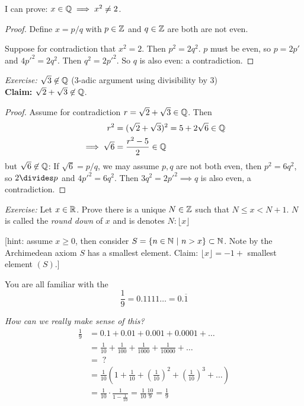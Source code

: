 \documentclass[10pt]{scrartcl}
\begin{document}
I can prove: $x \in \mathbb{Q} \implies x^2 \neq 2$. 
\begin{proof}
Define $x = p/q$ with $p \in \mathbb{Z}$ and $q\in \mathbb{Z}$ are both are not even. 

Suppose for contradiction that $x^2 = 2$. Then $p^2 = 2q^2$. $p$ must be even, so $p = 2p'$ and $4p'^2 = 2q^2$. Then $q^2 = 2p'^2$. So $q$ is also even: a contradiction. 
\end{proof}

\emph{Exercise:} $\sqrt{3} \not \in \mathbb{Q}$ ($3$-adic argument using divisibility by $3$)\\

\textbf{Claim:} $\sqrt{2} + \sqrt{3} \not \in \mathbb{Q}$. 
\begin{proof}
	Assume for contradiction $r = \sqrt{2} + \sqrt{3} \in \mathbb{Q}$. Then 
	\[
\begin{aligned}
  r^2 &= (\sqrt{2} + \sqrt{3})^2 = 5 + 2\sqrt{6} \in \mathbb{Q}\\
  \implies \sqrt{6} &= \frac{r^2-5}{2} \in \mathbb{Q} 
\end{aligned}
\]
but $\sqrt{6} \not \in \mathbb{Q}$: If $\sqrt{6} = p/q$, we may assume $p,q$ are not both even, then $p^2 = 6q^2$, so $2 \divides p$ and $4p'^2 = 6q^2$. Then $3q^2 = 2p'^2 \implies q$ is also even, a contradiction. 
\end{proof}

\emph{Exercise:} Let $x \in\mathbb{R}$. Prove there is a unique $N \in \mathbb{Z}$ such that $N \leq x < N+1$. $N$ is called the \emph{round down} of $x$ and is denotes $N: \lfloor x \rfloor$

[hint: assume $x \geq 0$, then  consider $S = \{n \in\mathbb{N} ~|~ n > x\} \subset \mathbb{N}$. Note by the Archimedean axiom $S$ has a smallest element. Claim: $\lfloor x \rfloor = -1 + $ smallest element $(S)$.]


You are all familiar with the
\[\frac{1}{9} = 0.1111\dots = 0.\overline{1}\]\vspace*{5pt}

\emph{How can we really make sense of this?}
\[
\begin{aligned}
  \frac{1}{9} &= 0.1 + 0.01 + 0.001 + 0.0001 + \dots\\
  &= \frac{1}{10} + \frac{1}{100} + \frac{1}{1000} + \frac{1}{10000} + \dots\\
  &= \; ? \\
  &= \frac{1}{10}\left(1 + \frac{1}{10} + \left(\frac{1}{10}\right)^2 + \left(\frac{1}{10}\right)^3 + \dots \right)\\ 
  &= \frac{1}{10} \cdot\frac{1}{1-\frac{1}{10}} = \frac{1}{10}\frac{10}{9} = \frac{1}{9}
\end{aligned}
\]\vspace*{5pt}
\end{document}
